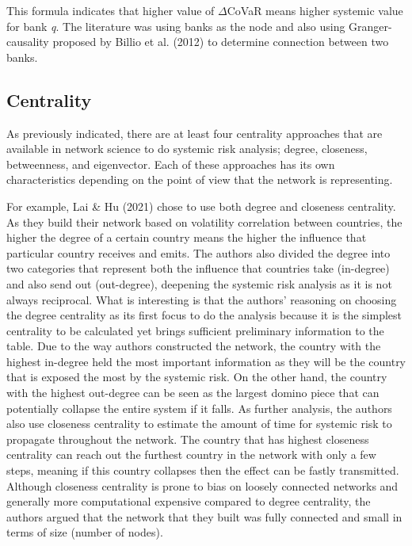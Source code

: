 \documentclass[a4paper,11pt]{article}
\begin{document}
This formula indicates that higher value of  $\Delta$CoVaR means higher systemic value for bank \textit{q}. The literature was using banks as the node and also using Granger-causality proposed by Billio et al. (2012) to determine connection between two banks.

\subsection{Centrality}
As previously indicated, there are at least four centrality approaches that are available in network science to do systemic risk analysis; degree, closeness, betweenness, and eigenvector. Each of these approaches has its own characteristics depending on the point of view that the network is representing.

For example, Lai \& Hu (2021) chose to use both degree and closeness centrality. As they build their network based on volatility correlation between countries, the higher the degree of a certain country means the higher the influence that particular country receives and emits. The authors also divided the degree into two categories that represent both the influence that countries take (in-degree) and also send out (out-degree), deepening the systemic risk analysis as it is not always reciprocal. What is interesting is that the authors’ reasoning on choosing the degree centrality as its first focus to do the analysis because it is the simplest centrality to be calculated yet brings sufficient preliminary information to the table. Due to the way authors constructed the network, the country with the highest in-degree held the most important information as they will be the country that is exposed the most by the systemic risk. On the other hand, the country with the highest out-degree can be seen as the largest domino piece that can potentially collapse the entire system if it falls. As further analysis, the authors also use closeness centrality to estimate the amount of time for systemic risk to propagate throughout the network. The country that has highest closeness centrality can reach out the furthest country in the network with only a few steps, meaning if this country collapses then the effect can be fastly transmitted. Although closeness centrality is prone to bias on loosely connected networks and generally more computational expensive compared to degree centrality, the authors argued that the network that they built was fully connected and small in terms of size (number of nodes). 
\end{document}

